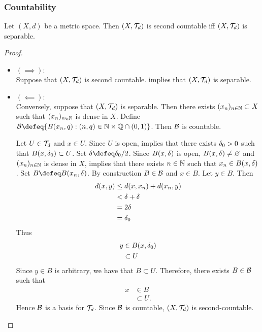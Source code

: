 \documentclass{book}
\begin{document}
\vspace{3cm}
\subsubsection{Countability}


\begin{ex} 
	Let $(X, d)$ be a metric space. Then $(X, \mathcal{T}_d)$ is second countable iff $(X, \mathcal{T}_d)$ is separable.
\end{ex}

\begin{proof}\
	\begin{itemize}
		\item $(\implies): $ \\
		Suppose that $(X, \mathcal{T}_d)$ is second countable.  implies that $(X, \mathcal{T}_d)$ is separable.
		\item $(\impliedby): $ \\
		Conversely, suppose that $(X, \mathcal{T}_d)$ is separable. Then there exists $(x_n)_{n \in \mathbb{N}} \subset X$ such that $(x_n)_{n \in \mathbb{N}}$ is dense in $X$. Define $\MB \defeq \{B(x_n, q): (n, q) \in \N \times \Q \cap (0,1)\}$. Then $\mathcal{B}$ is countable. 
		
		Let $U \in \mathcal{T}_d$ and $x \in U$. Since $U$ is open,  implies that there exists $\delta_0 > 0$ such that $B(x, \delta_0) \subset U$. Set $\del \defeq \del_0/2$. Since $B(x, \delta)$ is open, $B(x, \delta) \neq \varnothing$ and $(x_n)_{n \in \mathbb{N}}$ is dense in $X$,  implies that there exists $n \in \mathbb{N}$ such that $x_n \in B(x, \delta)$. Set $B \defeq B(x_n, \del)$. By construction $B \in \mathcal{B}$ and $x \in B$. Let $y \in B$. Then 
		\begin{align*}
			d(x, y)
			& \leq d(x, x_n) + d(x_n, y) \\
			& < \delta + \delta \\
			& = 2 \delta \\
			& = \delta_0 
		\end{align*}
		Thus 
		\begin{align*}
			y 
			& \in B(x, \delta_0) \\
			& \subset U
		\end{align*} 
		Since $y \in B$ is arbitrary, we have that $B \subset U$. Therefore, there exists $B \in \mathcal{B}$ such that 
		\begin{align*}
			x 
			& \in B \\
			& \subset U.
		\end{align*}
		Hence $\mathcal{B}$ is a basis for $\mathcal{T}_d$. Since $\mathcal{B}$ is countable, $(X, \mathcal{T}_d)$ is second-countable.
	\end{itemize}
\end{proof}
\end{document}
